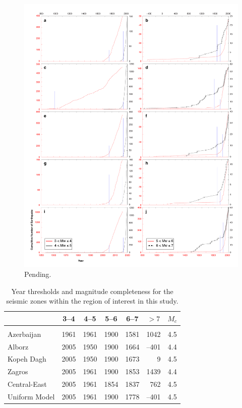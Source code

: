 \begin{figure}[t]
    \centering
    \includegraphics[scale=0.28]{figures/pdf/figure-05.pdf} 
    \caption{Pending.}
    \label{fig:completeness}
\end{figure}

\begin{table}[t]
    \centering
    \caption{Year thresholds and magnitude completeness for the seismic zones within the region of interest in this study.}
    \begin{tabular}{@{\hspace{0.2ex}}lccccrc@{\hspace{0.2ex}}}
        \cline{2-7}                                              \\[-1.6ex]
                        & 3--4 & 4--5 & 5--6 & 6--7 & 
                                  \multicolumn{1}{c}{$>7$} &$M_c$\\[0.6ex]
        \hline                                                   \\[-1.6ex]
        Azerbaijan      & 1961 & 1961 & 1900 & 1581 & 1042 & 4.5 \\
        Alborz          & 2005 & 1950 & 1900 & 1664 &--401 & 4.4 \\
        Kopeh Dagh      & 2005 & 1950 & 1900 & 1673 &    9 & 4.5 \\
        Zagros          & 2005 & 1961 & 1900 & 1853 & 1439 & 4.4 \\
        Central-East    & 2005 & 1961 & 1854 & 1837 &  762 & 4.5 \\
        Uniform Model   & 2005 & 1961 & 1900 & 1778 &--401 & 4.5 \\[0.5ex]
        \hline 
    \end{tabular}
    \label{tab:params} 
\end{table}

